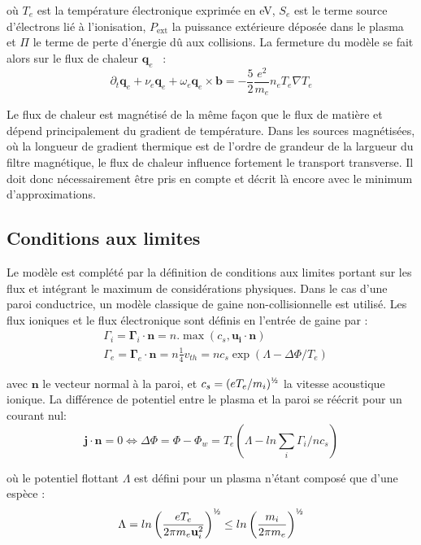 \begin{refsection}
où $T_e$ est la température électronique exprimée en eV, $S_e$ est le
terme source d'électrons lié à l'ionisation, $P_\text{ext}$ la puissance
extérieure déposée dans le plasma et $\Pi$ le terme de perte d'énergie dû aux
collisions. La fermeture du modèle se fait alors sur le flux de chaleur $\mathbf{q}_e$~\cite{Golant} :
\begin{equation}
\partial_t \mathbf{q}_e + \nu_e\mathbf{q}_e+\omega_e\mathbf{q}_e\times\mathbf{b} =
-\frac{5}{2}\frac{e^2}{m_e}n_eT_e\nabla T_e
\end{equation}

Le flux de chaleur est magnétisé de la même façon que le flux de matière et
dépend principalement du gradient de température. Dans les sources magnétisées,
où la longueur de gradient thermique est de l'ordre de grandeur de la largueur
du filtre magnétique, le flux de chaleur influence fortement le transport
transverse. Il doit donc nécessairement être pris en compte et décrit là encore
avec le minimum d'approximations.

\subsection{Conditions aux limites}
Le modèle est complété par la définition de conditions aux limites
portant sur les flux et intégrant le maximum de considérations physiques. Dans
le cas d'une paroi conductrice, un modèle classique de gaine non-collisionnelle
est utilisé. Les flux ioniques et le flux électronique sont définis en
l'entrée de gaine par :
\begin{align}
&\Gamma_i=\boldsymbol{\Gamma}_i\cdot\mathbf{n}=n.\max\left(c_s,\mathbf{u_i}\cdot\mathbf{n}\right)
\\
&\Gamma_e=\boldsymbol{\Gamma}_e\cdot\mathbf{n}=n\frac{1}{4}v_{th}=nc_s\exp(\Lambda-\Delta
\Phi/T_e)
\end{align}

avec $\mathbf{n}$ le vecteur normal à la paroi,
et $c_s=(eT_e/m_i)^{\text{\textonehalf}}$ la vitesse acoustique ionique.
La différence de potentiel entre le plasma et la
paroi se réécrit pour un courant nul:
\begin{equation}
	\mathbf{j}\cdot\mathbf{n}=0\Leftrightarrow \Delta \Phi=\Phi-\Phi_w =
T_e(\Lambda-ln\sum_i\Gamma_i/nc_s)
\end{equation} 

où le potentiel flottant $\Lambda$ est défini pour un plasma
n'étant composé que d'une espèce :
\begin{equation}
	\Lambda=ln\left(\frac{eT_e}{2\pi
	m_e\mathbf{u}_i^2}\right)^{\text{\textonehalf}} \le 
	ln\left(\frac{m_i}{2\pi m_e}\right)^{\text{\textonehalf}}
\end{equation}


\end{refsection}
